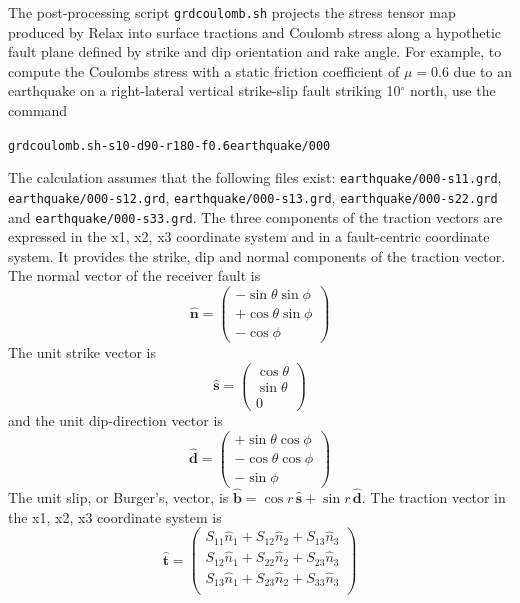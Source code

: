 \documentclass[10pt]{article}
\begin{document}
The post-processing script \verb'grdcoulomb.sh' projects the stress tensor map produced by Relax into surface tractions and Coulomb stress along a hypothetic fault plane defined by strike and dip orientation and rake angle. For example, to compute the Coulombs stress with a static friction coefficient of $\mu=0.6$ due to an earthquake on a right-lateral vertical strike-slip fault striking 10$^\circ$ north, use the command
\begin{alltt}
{\color{NavyBlue}grdcoulomb.sh -s 10 -d 90 -r 180 -f 0.6 earthquake/000}
\end{alltt}
The calculation assumes that the following files exist: \verb'earthquake/000-s11.grd', \verb'earthquake/000-s12.grd', \verb'earthquake/000-s13.grd', \verb'earthquake/000-s22.grd' and \verb'earthquake/000-s33.grd'. The three components of the traction vectors are expressed in the x1, x2, x3 coordinate system and in a fault-centric coordinate system. It provides the strike, dip and normal components of the traction vector. The normal vector of the receiver fault is 
\begin{equation}
\hat{\textbf{n}}=\left(\begin{matrix}
-\sin\theta\sin\phi\\
+\cos\theta\sin\phi\\
-\cos\phi\end{matrix}\right)
\end{equation}
The unit strike vector is
\begin{equation}
\hat{\textbf{s}}=\left(\begin{matrix}
\cos\theta\\
\sin\theta\\
0\end{matrix}\right)
\end{equation}
and the unit dip-direction vector is
\begin{equation}
\hat{\textbf{d}}=\left(\begin{matrix}
+\sin\theta\cos\phi\\
-\cos\theta\cos\phi\\
-\sin\phi\end{matrix}\right)
\end{equation}
The unit slip, or Burger's, vector, is $\hat{\textbf{b}}=\cos r\,\hat{\textbf{s}}+\sin r\,\hat{\textbf{d}}$. The traction vector in the x1, x2, x3 coordinate system is
\begin{equation}
\hat{\textbf{t}}=\left(\begin{aligned}
S_{11} \hat{n}_1 + S_{12} \hat{n}_2 + S_{13} \hat{n}_3\\
S_{12} \hat{n}_1 + S_{22} \hat{n}_2 + S_{23} \hat{n}_3\\
S_{13} \hat{n}_1 + S_{23} \hat{n}_2 + S_{33} \hat{n}_3\\
\end{aligned}\right)
\end{equation}
\end{document}
